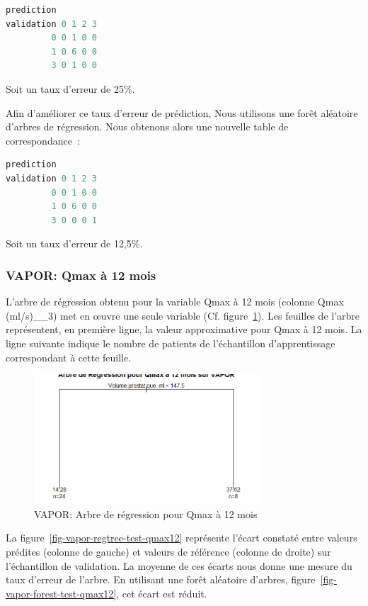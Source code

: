 \begin{lstlisting}[language=R]
          prediction
validation 0 1 2 3
         0 0 1 0 0
         1 0 6 0 0
         3 0 1 0 0
\end{lstlisting}
Soit un taux d'erreur de 25\%.

Afin d'améliorer ce taux d'erreur de prédiction, Nous utilisons une forêt aléatoire d'arbres de régression. Nous obtenons alors une nouvelle table de correspondance~:

\begin{lstlisting}[language=R]
          prediction
validation 0 1 2 3
         0 0 1 0 0
         1 0 6 0 0
         3 0 0 0 1
\end{lstlisting}
Soit un taux d'erreur de 12,5\%.


\subsubsection{VAPOR: Qmax à 12 mois}

L'arbre de régression obtenu pour la variable Qmax à 12 mois (colonne Qmax (ml/s)\_\_3) met en {\oe}uvre une seule variable (Cf. figure~\ref{fig-vapor-regtree-qmax12}). Les feuilles de l'arbre représentent, en première ligne, la valeur approximative pour Qmax à 12 mois. La ligne suivante indique le nombre de patients de l'échantillon d'apprentissage correspondant à cette feuille. 

\begin{figure}[H]
\centering
\includegraphics[width=0.75\textwidth]{../Fig/VAPOR/vapor-regtree-qmax12.png}
\caption{VAPOR: Arbre de régression pour Qmax à 12 mois}
\label{fig-vapor-regtree-qmax12}
\end{figure}

La figure~\ref{fig-vapor-regtree-test-qmax12} représente l'écart constaté entre valeurs prédites (colonne de gauche) et valeurs de référence (colonne de droite) sur l'échantillon de validation. La moyenne de ces écarts nous donne une mesure du taux d'erreur de l'arbre. En utilisant une forêt aléatoire d'arbres, figure~\ref{fig-vapor-forest-test-qmax12}, cet écart est réduit.


